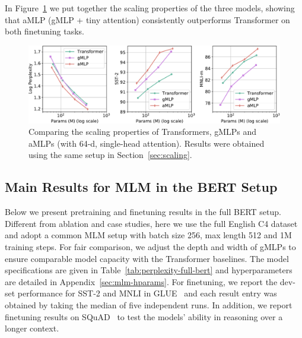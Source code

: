 \documentclass{article}
\newcommand{\gffn}{gMLP\xspace}
\begin{document}
In Figure~\ref{fig:scaling-with-tinyattn}
we put together the scaling properties of the three models,
showing that aMLP (gMLP + tiny attention) consistently outperforms Transformer on both finetuning tasks.

\begin{figure}[h]
    \centering
    \includegraphics[width=0.9\linewidth]{figures/scaling-with-tinyattn.pdf}
    \caption{Comparing the scaling properties of Transformers, \gffn{s} and aMLPs (with 64-d, single-head attention). Results were obtained using the same setup in Section~\ref{sec:scaling}.}
    \label{fig:scaling-with-tinyattn}
\end{figure}

\FloatBarrier
\subsection{Main Results for MLM in the BERT Setup}
Below we present pretraining and finetuning results in the full BERT setup. Different from ablation and case studies, here we use the full English C4 dataset and adopt a common MLM setup with batch size 256, max length 512 and 1M training steps.
For fair comparison, we adjust the depth and width of \gffn{s} to ensure comparable model capacity with the Transformer baselines.
The model specifications are given in Table~\ref{tab:perplexity-full-bert} and hyperparameters are detailed in Appendix~\ref{sec:mlm-hparams}.
For finetuning, we report the dev-set performance for SST-2 and MNLI in GLUE~\cite{wang2018glue} and each result entry was obtained by taking the median of five independent runs.
In addition,
we report finetuning results on SQuAD~\cite{rajpurkar2016squad, rajpurkar2018know} to test the models' ability in reasoning over a longer context.
\end{document}
